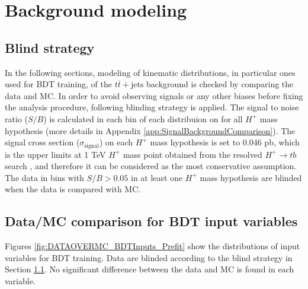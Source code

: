 \section{Background modeling}
\label{sec:BkgModeling}

\subsection{Blind strategy}
\label{subsec:BlindStrategy}
In the following sections, modeling of kinematic distributions, in particular ones used for BDT training, of the $t\bar{t}+\text{jets}$ background is checked by comparing the data and MC. In order to avoid observing signals or any other biases before fixing the analysis procedure, following blinding strategy is applied. The signal to noise ratio ($S/B$) is calculated in each bin of each distribuion on for all $H^{+}$ mass hypothesis (more details in Appendix \ref{app:SignalBackgroundComparison}). The signal cross section (${\sigma}_{\text{signal}}$) on each $H^{+}$ mass hypothesis is set to 0.046 pb, which is the upper limits at 1 TeV $H^{+}$ mass point obtained from the resolved $H^{+}{\rightarrow}tb$ search \cite{HDBS-2021-02}, and therefore it can be considered as the most conservative assumption. The data in bins with $S/B>0.05$ in at least one $H^{+}$ mass hypothesis are blinded when the data is compared with MC.


\subsection{Data/MC comparison for BDT input variables}
\label{subsec:Data/MCBDTInputBeforeReweight}
Figures \ref{fig:DATAOVERMC_BDTInputs_Prefit} show the distributions of input variables for BDT training. Data are blinded according to the blind strategy in Section \ref{subsec:BlindStrategy}. No significant difference between the data and MC is found in each variable.

